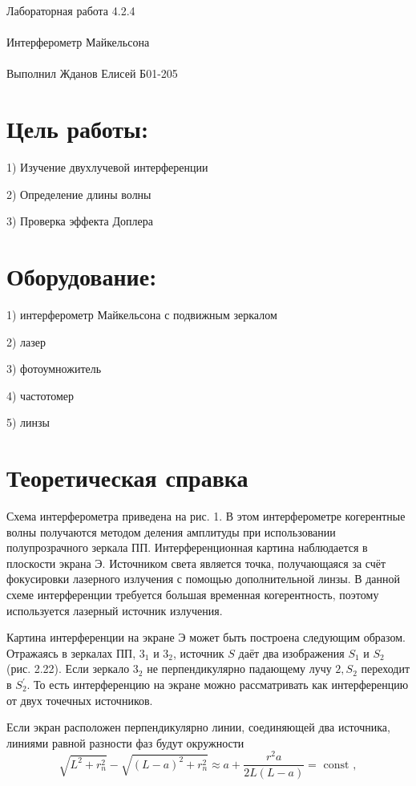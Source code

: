 \documentclass{astroedu-lab}
\begin{document}
\pagestyle{plain}

\begin{problem}{\huge Лабораторная работа 4.2.4\\\\Интерферометр Майкельсона\\\\Выполнил Жданов Елисей Б01-205}

\section{Цель работы:}

1) Изучение двухлучевой интерференции

2) Определение длины волны

3) Проверка эффекта Доплера

\section{Оборудование:}

1) интерферометр Майкельсона с подвижным зеркалом

2) лазер

3) фотоумножитель

4) частотомер

5) линзы

\section{Теоретическая справка}

Схема интерферометра приведена на рис. 1. В этом интерферометре когерентные волны получаются методом деления амплитуды при использовании полупрозрачного зеркала ПП. Интерференционная картина наблюдается в плоскости экрана Э. Источником света является точка, получающаяся за счёт фокусировки лазерного излучения с помощью дополнительной линзы. В данной схеме интерференции требуется большая временная когерентность, поэтому используется лазерный источник излучения.

Картина интерференции на экране Э может быть построена следующим образом. Отражаясь в зеркалах ПП, $3_1$ и $3_2$, источник $S$ даёт два изображения $S_1$ и $S_2$ (рис. 2.22). Если зеркало $3_2$ не перпендикулярно падающему лучу $2, S_2$ переходит в $S_2^{\prime}$. То есть интерференцию на экране можно рассматривать как интерференцию от двух точечных источников.

Если экран расположен перпендикулярно линии, соединяющей два источника, линиями равной разности фаз будут окружности
$$
\sqrt{L^2+r_n^2}-\sqrt{(L-a)^2+r_n^2} \approx a+\frac{r^2 a}{2 L(L-a)}=\text { const },
$$


\end{problem}
\end{document}
